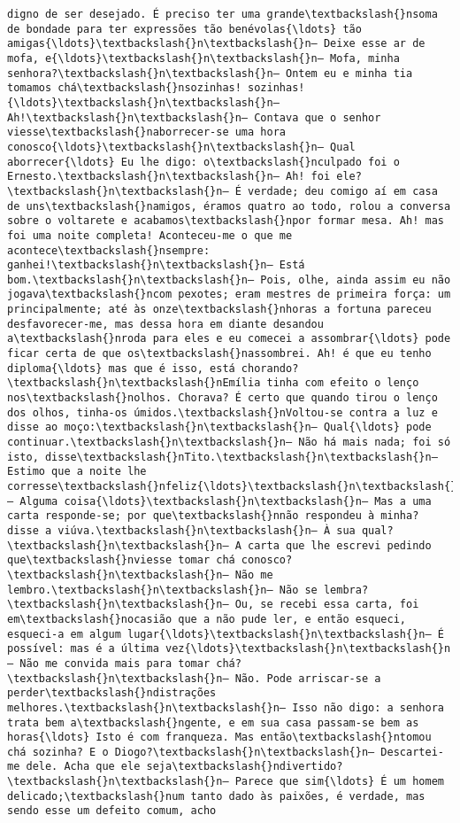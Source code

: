 \begin{Verbatim}[commandchars=\\\{\}]
digno de ser desejado. É preciso ter uma grande\textbackslash{}nsoma de bondade para ter expressões tão benévolas{\ldots} tão amigas{\ldots}\textbackslash{}n\textbackslash{}n— Deixe esse ar de mofa, e{\ldots}\textbackslash{}n\textbackslash{}n— Mofa, minha senhora?\textbackslash{}n\textbackslash{}n— Ontem eu e minha tia tomamos chá\textbackslash{}nsozinhas! sozinhas!{\ldots}\textbackslash{}n\textbackslash{}n— Ah!\textbackslash{}n\textbackslash{}n— Contava que o senhor viesse\textbackslash{}naborrecer-se uma hora conosco{\ldots}\textbackslash{}n\textbackslash{}n— Qual aborrecer{\ldots} Eu lhe digo: o\textbackslash{}nculpado foi o Ernesto.\textbackslash{}n\textbackslash{}n— Ah! foi ele?\textbackslash{}n\textbackslash{}n— É verdade; deu comigo aí em casa de uns\textbackslash{}namigos, éramos quatro ao todo, rolou a conversa sobre o voltarete e acabamos\textbackslash{}npor formar mesa. Ah! mas foi uma noite completa! Aconteceu-me o que me acontece\textbackslash{}nsempre: ganhei!\textbackslash{}n\textbackslash{}n— Está bom.\textbackslash{}n\textbackslash{}n— Pois, olhe, ainda assim eu não jogava\textbackslash{}ncom pexotes; eram mestres de primeira força: um principalmente; até às onze\textbackslash{}nhoras a fortuna pareceu desfavorecer-me, mas dessa hora em diante desandou a\textbackslash{}nroda para eles e eu comecei a assombrar{\ldots} pode ficar certa de que os\textbackslash{}nassombrei. Ah! é que eu tenho diploma{\ldots} mas que é isso, está chorando?\textbackslash{}n\textbackslash{}nEmília tinha com efeito o lenço nos\textbackslash{}nolhos. Chorava? É certo que quando tirou o lenço dos olhos, tinha-os úmidos.\textbackslash{}nVoltou-se contra a luz e disse ao moço:\textbackslash{}n\textbackslash{}n— Qual{\ldots} pode continuar.\textbackslash{}n\textbackslash{}n— Não há mais nada; foi só isto, disse\textbackslash{}nTito.\textbackslash{}n\textbackslash{}n— Estimo que a noite lhe corresse\textbackslash{}nfeliz{\ldots}\textbackslash{}n\textbackslash{}n— Alguma coisa{\ldots}\textbackslash{}n\textbackslash{}n— Mas a uma carta responde-se; por que\textbackslash{}nnão respondeu à minha? disse a viúva.\textbackslash{}n\textbackslash{}n— À sua qual?\textbackslash{}n\textbackslash{}n— A carta que lhe escrevi pedindo que\textbackslash{}nviesse tomar chá conosco?\textbackslash{}n\textbackslash{}n— Não me lembro.\textbackslash{}n\textbackslash{}n— Não se lembra?\textbackslash{}n\textbackslash{}n— Ou, se recebi essa carta, foi em\textbackslash{}nocasião que a não pude ler, e então esqueci, esqueci-a em algum lugar{\ldots}\textbackslash{}n\textbackslash{}n— É possível: mas é a última vez{\ldots}\textbackslash{}n\textbackslash{}n— Não me convida mais para tomar chá?\textbackslash{}n\textbackslash{}n— Não. Pode arriscar-se a perder\textbackslash{}ndistrações melhores.\textbackslash{}n\textbackslash{}n— Isso não digo: a senhora trata bem a\textbackslash{}ngente, e em sua casa passam-se bem as horas{\ldots} Isto é com franqueza. Mas então\textbackslash{}ntomou chá sozinha? E o Diogo?\textbackslash{}n\textbackslash{}n— Descartei-me dele. Acha que ele seja\textbackslash{}ndivertido?\textbackslash{}n\textbackslash{}n— Parece que sim{\ldots} É um homem delicado;\textbackslash{}num tanto dado às paixões, é verdade, mas sendo esse um defeito comum, acho 
\end{Verbatim}
